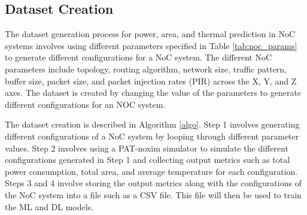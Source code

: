 \documentclass[conference]{IEEEtran}
\begin{document}
\subsection{Dataset Creation}

The dataset generation process for power, area, and thermal prediction in NoC systems involves using different parameters specified in Table \ref{tab:noc_params} to generate different configurations for a NoC system. The different NoC parameters include topology, routing algorithm, network size, traffic pattern, buffer size, packet size, and packet injection rates (PIR) across the X, Y, and Z axes. The dataset is created by changing the value of the parameters to generate different configurations for an NOC system.

The dataset creation is described in Algorithm \ref{algo}. Step 1 involves generating different configurations of a NoC system by looping through different parameter values. Step 2 involves using a PAT-noxim simulator to simulate the different configurations generated in Step 1 and collecting output metrics such as total power consumption, total area, and average temperature for each configuration. Steps 3 and 4 involve storing the output metrics along with the configurations of the NoC system into a file such as a CSV file. This file will then be used to train the ML and DL models. 
\end{document}
